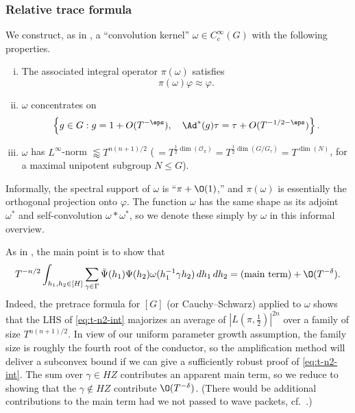 \subsubsection{Relative trace formula}\label{sec:relat-trace-form}
We construct, as in \cite[\S1.5.2]{2020arXiv201202187N}, a ``convolution kernel'' $\omega \in C_c^\infty(G)$ with the following properties.
\begin{enumerate}[(i)]
\item The associated integral operator $\pi(\omega)$ satisfies
  \begin{equation}\label{eq:piom-varphi-appr}
    \pi(\omega) \varphi \approx \varphi.
  \end{equation}
\item $\omega$ concentrates on
  \begin{equation*}
    \left\{ g \in G : g = 1 + O(T^{-\eps}), \quad \Ad^*(g) \tau = \tau + O(T^{-1/2-\eps}) \right\}.
  \end{equation*}
\item $\omega$ has $L^\infty$-norm $\lessapprox T^{n(n+1)/2} $ ($ \, = T^{\frac{1}{2} \dim(\mathcal{O}_\pi)} = T^{\frac{1}{2} \dim(G / G_\tau)} = T^{\dim(N)}$, for a maximal unipotent subgroup $N \leq G$).
\end{enumerate}
Informally, the spectral support of $\omega$ is ``$\pi + \O(1)$,'' and $\pi(\omega)$ is essentially the orthogonal projection onto $\varphi$.  The function $\omega$ has the same shape as its adjoint $\omega^*$ and self-convolution $\omega \ast \omega^{\ast}$, so we denote these simply by $\omega$ in this informal overview.


As in \cite[\S1.5.3]{2020arXiv201202187N}, the main point is to show that
\begin{equation}\label{eq:t-n2-int}
  T^{-n/2} \int_{h_1, h_2 \in [H]} \sum_{\gamma \in \Gamma } \bar{\Psi}(h_1) \Psi(h_2) \omega(h_1^{-1} \gamma h_2) \, d h_1 \, d h_2
  = (\text{main term}) + \O(T^{-\delta}).
\end{equation}
Indeed, the pretrace formula for $[G]$ (or Cauchy--Schwarz) applied to $\omega$ shows that the LHS of \eqref{eq:t-n2-int} majorizes an average of $|L(\pi,\tfrac{1}{2})|^{2 n}$ over a family of size $T^{n(n+1)/2}$.  In view of our uniform parameter growth assumption, the family size is roughly the fourth root of the conductor, so the amplification method will deliver a subconvex bound if we can give a sufficiently robust proof of \eqref{eq:t-n2-int}.  The sum over $\gamma \in H Z$ contributes an apparent main term, so we reduce to showing that the $\gamma \notin H Z$ contribute $\O(T^{-\delta})$.  (There would be additional contributions to the main term had we not passed to wave packets, cf.\ \cite{MR2200997}.)


